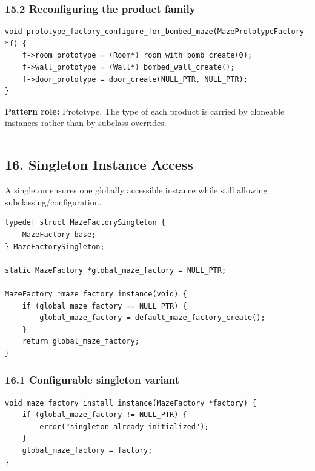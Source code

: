 \documentclass[11pt]{article}
\begin{document}
\subsubsection{15.2 Reconfiguring the product family}\label{reconfiguring-the-product-family}

\begin{verbatim}
void prototype_factory_configure_for_bombed_maze(MazePrototypeFactory *f) {
    f->room_prototype = (Room*) room_with_bomb_create(0);
    f->wall_prototype = (Wall*) bombed_wall_create();
    f->door_prototype = door_create(NULL_PTR, NULL_PTR);
}
\end{verbatim}

\textbf{Pattern role:} Prototype. The type of each product is carried by cloneable instances rather than by subclass overrides.

\begin{center}\rule{0.5\linewidth}{0.5pt}\end{center}

\subsection{16. Singleton Instance Access}\label{singleton-instance-access}

A singleton ensures one globally accessible instance while still allowing subclassing/configuration.

\begin{verbatim}
typedef struct MazeFactorySingleton {
    MazeFactory base;
} MazeFactorySingleton;

static MazeFactory *global_maze_factory = NULL_PTR;

MazeFactory *maze_factory_instance(void) {
    if (global_maze_factory == NULL_PTR) {
        global_maze_factory = default_maze_factory_create();
    }
    return global_maze_factory;
}
\end{verbatim}

\subsubsection{16.1 Configurable singleton variant}\label{configurable-singleton-variant}

\begin{verbatim}
void maze_factory_install_instance(MazeFactory *factory) {
    if (global_maze_factory != NULL_PTR) {
        error("singleton already initialized");
    }
    global_maze_factory = factory;
}
\end{verbatim}
\end{document}
